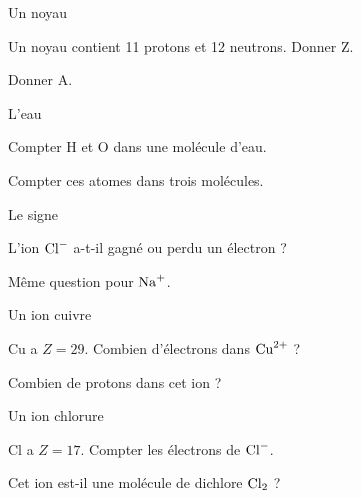 \par\noindent\begin{minipage}{\linewidth}
\begin{exercice}[1]{Un noyau}
\begin{questions}
\item Un noyau contient 11 protons et 12 neutrons. Donner Z.
\item Donner A.
\end{questions}
\end{exercice}
\end{minipage}
\par\noindent\begin{minipage}{\linewidth}
\begin{exercice}[1]{L’eau}
\begin{questions}
\item Compter H et O dans une molécule d’eau.
\item Compter ces atomes dans trois molécules.
\end{questions}
\end{exercice}
\end{minipage}
\par\noindent\begin{minipage}{\linewidth}
\begin{exercice}[1]{Le signe}
\begin{questions}
\item L’ion $\ce{Cl-}$ a-t-il gagné ou perdu un électron ?
\item Même question pour $\ce{Na+}$.
\end{questions}
\end{exercice}
\end{minipage}
\clearpage{}
\par\noindent\begin{minipage}{\linewidth}
\begin{exercice}[2]{Un ion cuivre}
\begin{questions}
\item Cu a $Z=29$. Combien d’électrons dans $\ce{Cu^{2+}}$ ?
\item Combien de protons dans cet ion ?
\end{questions}
\end{exercice}
\end{minipage}
\par\noindent\begin{minipage}{\linewidth}
\begin{exercice}[2]{Un ion chlorure}
\begin{questions}
\item Cl a $Z=17$. Compter les électrons de $\ce{Cl-}$.
\item Cet ion est-il une molécule de dichlore $\ce{Cl2}$ ?
\end{questions}
\end{exercice}
\end{minipage}
